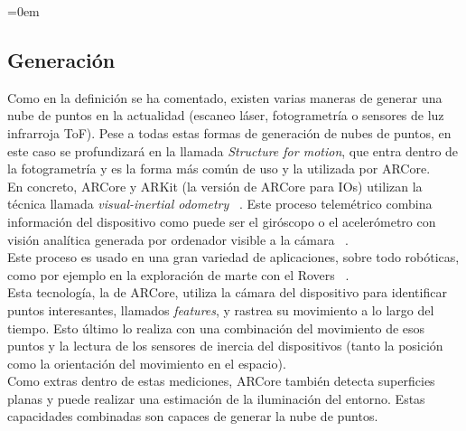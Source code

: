 \parindent=0em
\subsection{Generación}
\noindent

Como en la definición se ha comentado, existen varias maneras de generar una nube de puntos en la actualidad (escaneo láser, fotogrametría o sensores de luz infrarroja ToF). Pese a todas estas formas de generación de nubes de puntos, en este caso se profundizará en la llamada \textit{Structure for motion}, que entra dentro de la fotogrametría y es la forma más común de uso y la utilizada por ARCore. \\

En concreto, ARCore y ARKit (la versión de ARCore para IOs) utilizan la técnica llamada \textit{visual-inertial odometry} ~\cite{ VisualOdometry}. Este proceso telemétrico combina información del dispositivo como puede ser el giróscopo o el acelerómetro con visión analítica generada por ordenador visible a la cámara ~\cite{ WorldTracking}. \\

Este proceso es usado en una gran variedad de aplicaciones, sobre todo robóticas, como por ejemplo en la exploración de marte con el Rovers ~\cite{ MarsExploration}. \\

Esta tecnología, la de ARCore, utiliza la cámara del dispositivo para identificar puntos interesantes, llamados \textit{features}, y rastrea su movimiento a lo largo del tiempo. Esto último lo realiza con una combinación del movimiento de esos puntos y la lectura de los sensores de inercia del dispositivos (tanto la posición como la orientación del movimiento en el espacio).\\

Como extras dentro de estas mediciones, ARCore también detecta superficies planas y puede realizar una estimación de la iluminación del entorno. Estas capacidades combinadas son capaces de generar la nube de puntos.
~\cite{HowARCoreWorks} \\

